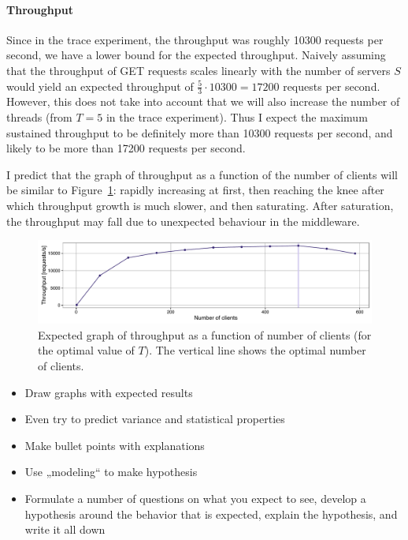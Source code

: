 \documentclass[11pt]{article}
\begin{document}
\paragraph{Throughput} Since in the trace experiment, the throughput was roughly 10300 requests per second, we have a lower bound for the expected throughput. Naively assuming that the throughput of GET requests scales linearly with the number of servers $S$ would yield an expected throughput of $\frac{5}{3} \cdot 10300 = 17200$ requests per second. However, this does not take into account that we will also increase the number of threads (from $T=5$ in the trace experiment). Thus I expect the maximum sustained throughput to be definitely more than 10300 requests per second, and likely to be more than 17200 requests per second.

I predict that the graph of throughput as a function of the number of clients will be similar to Figure~\ref{fig:exp1:hyp:throughput}: rapidly increasing at first, then reaching the knee after which throughput growth is much slower, and then saturating. After saturation, the throughput may fall due to unexpected behaviour in the middleware.

\begin{figure}[h]
\centering
\includegraphics[width=\textwidth]{figures/hypothesis_throughput.pdf}
\caption{Expected graph of throughput as a function of number of clients (for the optimal value of $T$). The vertical line shows the optimal number of clients.}
\label{fig:exp1:hyp:throughput}
\end{figure}



\begin{itemize}
\item Draw graphs with expected results
\item Even try to predict variance and statistical properties
\item Make bullet points with explanations
\item Use „modeling“ to make hypothesis
\item Formulate a number of questions on what you expect to see, develop a hypothesis around the behavior that is expected, explain the hypothesis, and write it all down
\end{itemize}
\end{document}
